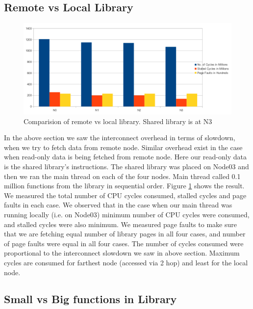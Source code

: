 \subsection{Remote vs Local Library} \label{sec:remoteVsLocal}

\begin{figure}
    \centering
    \includegraphics[scale=0.35]{remoteVsLocal.png}
    \caption{Comparision of remote vs local library. Shared library is at N3 }
    \label{fig:remoteVsLocal}
\end{figure}


In the above section we saw the interconnect overhead in terms of slowdown, when we try to fetch data from remote node.
Similar overhead exist in the case when read-only data is being fetched from remote node.
Here our read-only data is the shared library's instructions.
The shared library was placed on Node03 and then we ran the main thread on each of the four nodes.
Main thread called 0.1 million functions from the library in sequential order.
Figure \ref{fig:remoteVsLocal} shows the result.
We measured the total number of CPU cycles consumed, stalled cycles and page faults in each case.
We observed that in the case when our main thread was running locally (i.e. on Node03) minimum number of CPU cycles were consumed, and stalled cycles were also minimum.
We measured page faults to make sure that we are fetching equal number of library pages in all four cases, and number of page faults were equal in all four cases.
The number of cycles consumed were proportional to the interconnect slowdown we saw in above section.
Maximum cycles are consumed for farthest node (accessed via 2 hop) and least for the local node.



\subsection{Small vs Big functions in Library}


